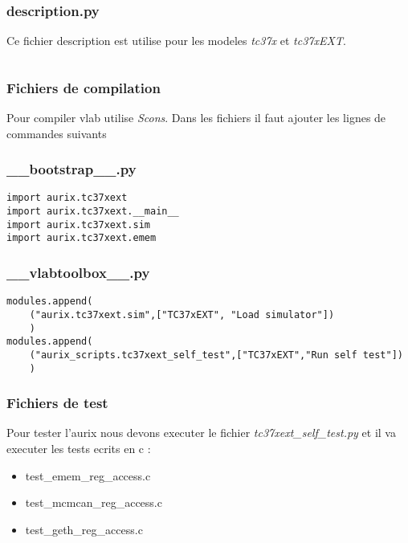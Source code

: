 \subsubsection*{description.py}
\label{anexe:tc37ex:description}
\begin{par}
Ce fichier description est utilise pour les modeles \textit{tc37x} et \textit{tc37xEXT}.
\end{par}
\inputminted[autogobble]{python}{anexes/tc37ex/description.py}

\subsubsection{Fichiers de compilation}
\label{anexe:tc37ex:compilation}
\begin{par}
Pour compiler vlab utilise \textit{Scons}. Dans les fichiers il faut ajouter les lignes de commandes suivants
\end{par}
\subsubsection*{\_\_bootstrap\_\_.py}
\begin{verbatim}
import aurix.tc37xext
import aurix.tc37xext.__main__
import aurix.tc37xext.sim
import aurix.tc37xext.emem
\end{verbatim}

\subsubsection*{\_\_vlabtoolbox\_\_.py}
\begin{verbatim}
modules.append(
    ("aurix.tc37xext.sim",["TC37xEXT", "Load simulator"])
    )
modules.append(
    ("aurix_scripts.tc37xext_self_test",["TC37xEXT","Run self test"])
    )
\end{verbatim}

\subsubsection{Fichiers de test}
\label{anexe:tc37ex:tests}
\begin{par}
Pour tester l'aurix nous devons executer le fichier \textit{tc37xext\_self\_test.py} et il va executer les tests ecrits en c :
\end{par}
\begin{itemize}
    \item test\_emem\_reg\_access.c
    \item test\_mcmcan\_reg\_access.c
    \item test\_geth\_reg\_access.c
\end{itemize}

